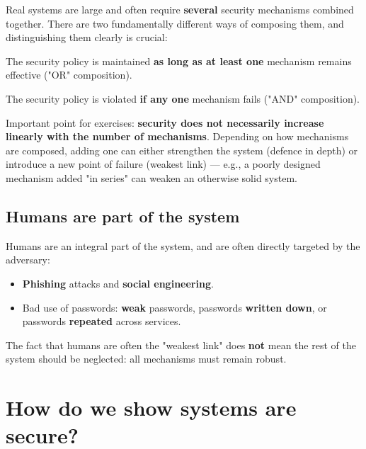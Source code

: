 Real systems are large and often require \textbf{several} security mechanisms combined together. There are two fundamentally different ways of composing them, and distinguishing them clearly is crucial:

\begin{definition}
The security policy is maintained \textbf{as long as at least one} mechanism remains effective ("OR" composition).
\end{definition}

\begin{definition}
The security policy is violated \textbf{if any one} mechanism fails ("AND" composition).
\end{definition}

\begin{remark}
Important point for exercises: \textbf{security does not necessarily increase linearly with the number of mechanisms}. Depending on how mechanisms are composed, adding one can either strengthen the system (defence in depth) or introduce a new point of failure (weakest link) — e.g., a poorly designed mechanism added "in series" can weaken an otherwise solid system.
\end{remark}

\subsection{Humans are part of the system}

Humans are an integral part of the system, and are often directly targeted by the adversary:

\begin{itemize}
    \item \textbf{Phishing} attacks and \textbf{social engineering}.
    \item Bad use of passwords: \textbf{weak} passwords, passwords \textbf{written down}, or passwords \textbf{repeated} across services.
\end{itemize}

\begin{remark}
The fact that humans are often the "weakest link" does \textbf{not} mean the rest of the system should be neglected: all mechanisms must remain robust.
\end{remark}

\section{How do we show systems are secure?}

